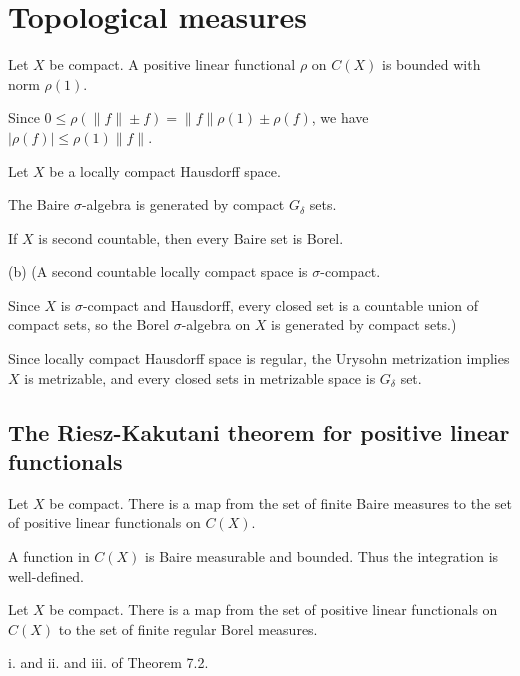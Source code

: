 \documentclass[a4paper,12pt]{report}
\begin{document}
\newpage
\section{Topological measures}
\begin{prb}
Let $X$ be compact.
A positive linear functional $\rho$ on $C(X)$ is bounded with norm $\rho(1)$.
\end{prb}
\begin{pf}
Since $0\le\rho(\|f\|\pm f)=\|f\|\rho(1)\pm\rho(f)$, we have $|\rho(f)|\le\rho(1)\|f\|$.
\end{pf}

\begin{prb}
Let $X$ be a locally compact Hausdorff space.
\begin{parts}
\item The Baire $\sigma$-algebra is generated by compact $G_\delta$ sets.
\item If $X$ is second countable, then every Baire set is Borel.
\end{parts}
\end{prb}
\begin{sol}
(b)
(A second countable locally compact space is $\sigma$-compact.

Since $X$ is $\sigma$-compact and Hausdorff, every closed set is a countable union of compact sets, so the Borel $\sigma$-algebra on $X$ is generated by compact sets.)

Since locally compact Hausdorff space is regular, the Urysohn metrization implies $X$ is metrizable, and every closed sets in metrizable space is $G_\delta$ set.
\end{sol}

\subsection{The Riesz-Kakutani theorem for positive linear functionals}
\begin{prb}
Let $X$ be compact.
There is a map from the set of finite Baire measures to the set of positive linear functionals on $C(X)$.
\end{prb}
\begin{sol}
A function in $C(X)$ is Baire measurable and bounded.
Thus the integration is well-defined.
\end{sol}

\begin{prb}
Let $X$ be compact.
There is a map from the set of positive linear functionals on $C(X)$ to the set of finite regular Borel measures.
\end{prb}
\begin{sol}
i. and ii. and iii. of Theorem 7.2.
\end{sol}
\end{document}
